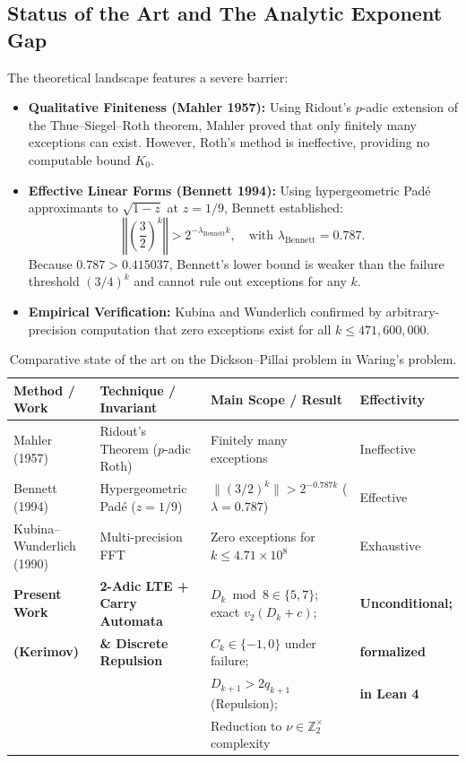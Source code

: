 \documentclass[11pt,reqno]{amsart}
\theoremstyle{definition}
\numberwithin{equation}{section}
\begin{document}
\subsection{Status of the Art and The Analytic Exponent Gap}
The theoretical landscape features a severe barrier:
\begin{itemize}
    \item \textbf{Qualitative Finiteness (Mahler 1957):} Using Ridout's $p$-adic extension of the Thue--Siegel--Roth theorem, Mahler \cite{mahler1957} proved that only finitely many exceptions can exist. However, Roth's method is ineffective, providing no computable bound $K_0$.
    \item \textbf{Effective Linear Forms (Bennett 1994):} Using hypergeometric Padé approximants to $\sqrt{1 - z}$ at $z = 1/9$, Bennett \cite{bennett1994} established:
    \begin{equation}\label{eq:bennett_bound}
    \left\Vert \left(\frac{3}{2}\right)^k \right\Vert > 2^{-\lambda_{\mathrm{Bennett}} k}, \quad \text{with } \lambda_{\mathrm{Bennett}} = 0.787.
    \end{equation}
    Because $0.787 > 0.415037$, Bennett's lower bound is weaker than the failure threshold $(3/4)^k$ and cannot rule out exceptions for any $k$.
    \item \textbf{Empirical Verification:} Kubina and Wunderlich \cite{kubina1990} confirmed by arbitrary-precision computation that zero exceptions exist for all $k \le 471{,}600{,}000$.
\end{itemize}

\begin{table}[htbp]
\centering
\small
\begin{tabular}{p{}p{}p{}p{}}
\toprule
\textbf{Method / Work} & \textbf{Technique / Invariant} & \textbf{Main Scope / Result} & \textbf{Effectivity} \\
\midrule
Mahler (1957) \cite{mahler1957} & Ridout's Theorem ($p$-adic Roth) & Finitely many exceptions & Ineffective \\
\addlinespace[2pt]
Bennett (1994) \cite{bennett1994} & Hypergeometric Padé ($z = 1/9$) & $\|(3/2)^k\| > 2^{-0.787 k}$ ($\lambda = 0.787$) & Effective \\
\addlinespace[2pt]
Kubina--Wunderlich (1990) \cite{kubina1990} & Multi-precision FFT & Zero exceptions for $k \le 4.71 \times 10^8$ & Exhaustive \\
\midrule
\textbf{Present Work} & \textbf{2-Adic LTE + Carry Automata} & $D_k \bmod 8 \in \{5, 7\}$; exact $v_2(D_k+c)$; & \textbf{Unconditional;} \\
\textbf{(Kerimov)} & \textbf{\& Discrete Repulsion} & $C_k \in \{-1, 0\}$ under failure; & \textbf{formalized} \\
 & & $D_{k+1} > 2 q_{k+1}$ (Repulsion); & \textbf{in Lean 4} \\
 & & Reduction to $\nu \in \mathbb{Z}_2^\times$ complexity & \\
\bottomrule
\end{tabular}
\caption{Comparative state of the art on the Dickson--Pillai problem in Waring's problem.}\label{tab:comparison}
\end{table}
\end{document}
